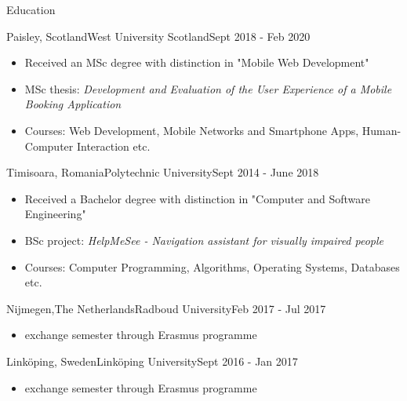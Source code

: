 \documentclass[]{mcdowellcv}
\begin{document}
	\begin{cvsection}{Education}
		\begin{cvsubsection}{Paisley, Scotland}{West University Scotland}{Sept 2018 - Feb 2020}
      \begin{itemize}
        \item Received an MSc degree with distinction in "Mobile Web Development"
        \item MSc thesis: \textit{Development and Evaluation of the User Experience of a Mobile Booking Application}
				\item Courses: Web Development, Mobile Networks and Smartphone Apps, Human-Computer Interaction etc.
			\end{itemize}
		\end{cvsubsection}

		\begin{cvsubsection}{Timisoara, Romania}{Polytechnic University}{Sept 2014 - June 2018}
			\begin{itemize}
				\item Received a Bachelor degree with distinction in "Computer and Software Engineering"
				\item BSc project: \textit{HelpMeSee - Navigation assistant for visually impaired people}
				\item Courses: Computer Programming, Algorithms, Operating Systems, Databases etc.
			\end{itemize}
		\end{cvsubsection}
	
		\begin{cvsubsection}{Nijmegen,The Netherlands}{Radboud University}{Feb 2017 - Jul 2017}
			\begin{itemize}
				\item exchange semester through Erasmus programme 
			\end{itemize}
		\end{cvsubsection}

		\begin{cvsubsection}{Linköping, Sweden}{Linköping University}{Sept 2016 - Jan 2017}
			\begin{itemize}
				\item exchange semester through Erasmus programme 
			\end{itemize}
		\end{cvsubsection}

	\end{cvsection}
	
\end{document}
